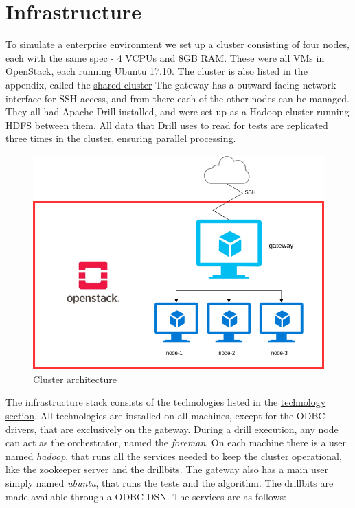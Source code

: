 \documentclass[a4paper,english]{report}
\begin{document}
		\section{Infrastructure}
			To simulate a enterprise environment we set up a cluster consisting of four nodes, each with the same spec - 4 VCPUs and 8GB RAM. These were all VMs in OpenStack, each running Ubuntu 17.10. The cluster is also listed in the appendix, called the \hyperref[table:cluster_shared]{shared cluster} The gateway has a outward-facing network interface for SSH access, and from there each of the other nodes can be managed. They all had Apache Drill installed, and were set up as a Hadoop cluster running HDFS between them. All data that Drill uses to read for tests are replicated three times in the cluster, ensuring parallel processing.
			\begin{figure}[h]
				\includegraphics[width=\textwidth]{cluster}
				\caption{Cluster architecture}
			\end{figure}
			The infrastructure stack consists of the technologies listed in the \hyperref[technology]{technology section}. All technologies are installed on all machines, except for the ODBC drivers, that are exclusively on the gateway. During a drill execution, any node can act as the orchestrator, named the \textit{foreman}. On each machine there is a user named \textit{hadoop}, that runs all the services needed to keep the cluster operational, like the zookeeper server and the drillbits. The gateway also has a main user simply named \textit{ubuntu}, that runs the tests and the algorithm. The drillbits are made available through a ODBC DSN.
			The services are as follows:
\end{document}
